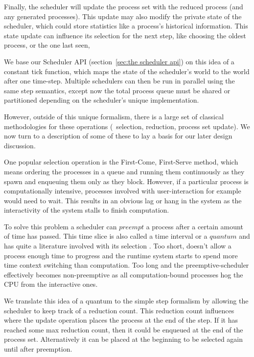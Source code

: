 Finally, the scheduler will update the process set with the
reduced process (and any generated processes). This update may also modify the 
private state of the scheduler, which could store statistics like a process's 
historical information. This state update can influence its selection for the
next step, like choosing the oldest process, or the one last seen, \etc

We base our Scheduler API (section~\ref{sec:the scheduler api}) on this 
idea of a constant tick function, which maps the state of the scheduler's world 
to the world after one time-step. Multiple schedulers can then be run in parallel 
using the same step semantics, except now the total process queue must be shared 
or partitioned depending on the scheduler's unique implementation.

However, outside of this unique formalism, there is a large set of classical
methodologies for these operations (\eg~selection, reduction, process set update).
We now turn to a description of some of these to lay a basis for our later 
design discussion.

One popular selection operation is the First-Come, First-Serve method, 
which means ordering 
the processes in a queue and running them continuously as they spawn and enqueuing them only as they 
block. However, if a particular
process is computationally intensive, processes involved with user-interaction 
for example would need to wait. This results in an obvious lag or hang in the 
system as the interactivity of the system stalls to finish computation.

To solve this problem a scheduler can $preempt$ a process after a certain amount
of time has passed. This time slice is also called a time interval or a $quantum$
and has quite a literature involved with its selection
\cite{alam2008finding, mostafa2010finding, saeidi2012determining}.
Too short, doesn't allow a process enough time to progress and the runtime system
starts to spend more time context switching than computation. Too long and the
preemptive-scheduler effectively becomes non-preemptive as all computation-bound
processes hog the CPU from the interactive ones.

We translate this idea of a quantum to the simple step formalism by allowing the
scheduler to keep track of a reduction count. This reduction count influences 
where the update operation places the process at the end of the step. If it has
reached some max reduction count, then it could be enqueued at the end of the 
process set. Alternatively it can be placed at the beginning to be selected
again until after preemption.

